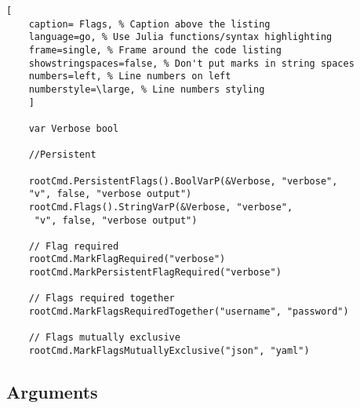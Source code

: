 \documentclass[11pt]{scrartcl} %
\begin{document}
\begin{lstlisting}[
	caption= Flags, % Caption above the listing
	language=go, % Use Julia functions/syntax highlighting
	frame=single, % Frame around the code listing
	showstringspaces=false, % Don't put marks in string spaces
	numbers=left, % Line numbers on left
	numberstyle=\large, % Line numbers styling
	]

	var Verbose bool

	//Persistent

	rootCmd.PersistentFlags().BoolVarP(&Verbose, "verbose", 
	"v", false, "verbose output")
	rootCmd.Flags().StringVarP(&Verbose, "verbose",
	 "v", false, "verbose output")

	// Flag required
	rootCmd.MarkFlagRequired("verbose")
	rootCmd.MarkPersistentFlagRequired("verbose")

	// Flags required together
	rootCmd.MarkFlagsRequiredTogether("username", "password")

	// Flags mutually exclusive
	rootCmd.MarkFlagsMutuallyExclusive("json", "yaml")

\end{lstlisting}

\subsection{Arguments}






\end{document}
